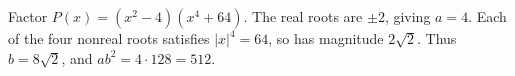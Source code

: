 Factor $P(x)=(x^2-4)(x^4+64)$. The real roots are $\pm2$, giving $a=4$. Each of the four nonreal roots satisfies $|x|^4=64$, so has magnitude $2\sqrt2$. Thus $b=8\sqrt2$, and $ab^2=4\cdot128=\boxed{512}$.
